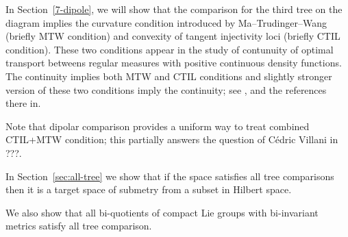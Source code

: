 In Section~\ref{7-dipole}, we will show that the comparison for the third tree on the diagram implies
the curvature condition introduced by Ma--Trudinger--Wang (briefly MTW condition) and convexity of tangent injectivity loci (briefly CTIL condition).
These two conditions appear in the study of contunuity of optimal transport betweens regular measures with positive continuous density functions.
The continuity implies both MTW and CTIL conditions and slightly stronger version of these two conditions imply the continuity;
see \cite{FRV-Nec+Suf}, \cite{MTW+CTIL} and the references there in.

Note that dipolar comparison provides a uniform way to treat combined CTIL+MTW condition;
this partially answers the question of Cédric Villani in ???.

In Section~\ref{sec:all-tree} we show that if the space satisfies all tree comparisons then it is a target space of submetry from a subset in Hilbert space.

We also show that all bi-quotients of compact Lie groups with bi-invariant metrics satisfy all tree comparison.

